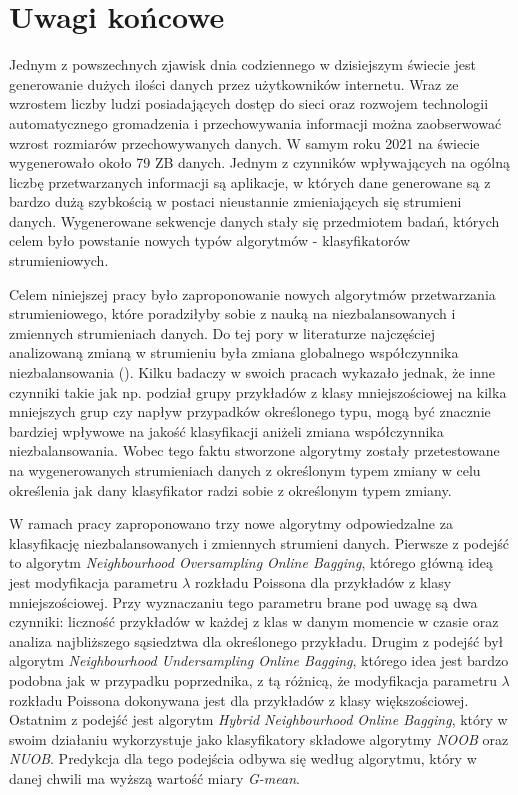 \chapter{Uwagi końcowe}

\noindent Jednym z powszechnych zjawisk dnia codziennego w dzisiejszym świecie jest generowanie dużych ilości danych przez użytkowników internetu. Wraz ze wzrostem liczby ludzi posiadających dostęp do sieci oraz rozwojem technologii automatycznego gromadzenia i przechowywania informacji można zaobserwować wzrost rozmiarów przechowywanych danych. W samym roku 2021 na świecie wygenerowało około 79 ZB danych. Jednym z czynników wpływających na ogólną liczbę przetwarzanych informacji są aplikacje, w których dane generowane są z bardzo dużą szybkością w postaci nieustannie zmieniających się strumieni danych. Wygenerowane sekwencje danych stały się przedmiotem badań, których celem było powstanie nowych typów algorytmów - klasyfikatorów strumieniowych.

Celem niniejszej pracy było zaproponowanie nowych algorytmów przetwarzania strumieniowego, które poradziłyby sobie z nauką na niezbalansowanych i zmiennych strumieniach danych. Do tej pory w literaturze najczęściej analizowaną zmianą w strumieniu była zmiana globalnego współczynnika niezbalansowania (). Kilku badaczy w swoich pracach wykazało jednak, że inne czynniki takie jak np. podział grupy przykładów z klasy mniejszościowej na kilka mniejszych grup czy napływ przypadków określonego typu, mogą być znacznie bardziej wpływowe na jakość klasyfikacji aniżeli zmiana współczynnika niezbalansowania. Wobec tego faktu stworzone algorytmy zostały przetestowane na wygenerowanych strumieniach danych z określonym typem zmiany w celu określenia jak dany klasyfikator radzi sobie z określonym typem zmiany.

W ramach pracy zaproponowano trzy nowe algorytmy odpowiedzalne za klasyfikację niezbalansowanych i zmiennych strumieni danych. Pierwsze z podejść to algorytm \textit{Neighbourhood Oversampling Online Bagging}, którego główną ideą jest modyfikacja parametru $\lambda$ rozkładu Poissona dla przykładów z klasy mniejszościowej. Przy wyznaczaniu tego parametru brane pod uwagę są dwa czynniki: liczność przykładów w każdej z klas w danym momencie w czasie oraz analiza najbliższego sąsiedztwa dla określonego przykładu. Drugim z podejść był algorytm \textit{Neighbourhood Undersampling Online Bagging}, którego idea jest bardzo podobna jak w przypadku poprzednika, z tą różnicą, że modyfikacja parametru $\lambda$ rozkładu Poissona dokonywana jest dla przykładów z klasy większościowej. Ostatnim z podejść jest algorytm \textit{Hybrid Neighbourhood Online Bagging}, który w swoim działaniu wykorzystuje jako klasyfikatory składowe algorytmy \textit{NOOB} oraz \textit{NUOB}. Predykcja dla tego podejścia odbywa się według algorytmu, który w danej chwili ma wyższą wartość miary \textit{G-mean}.

